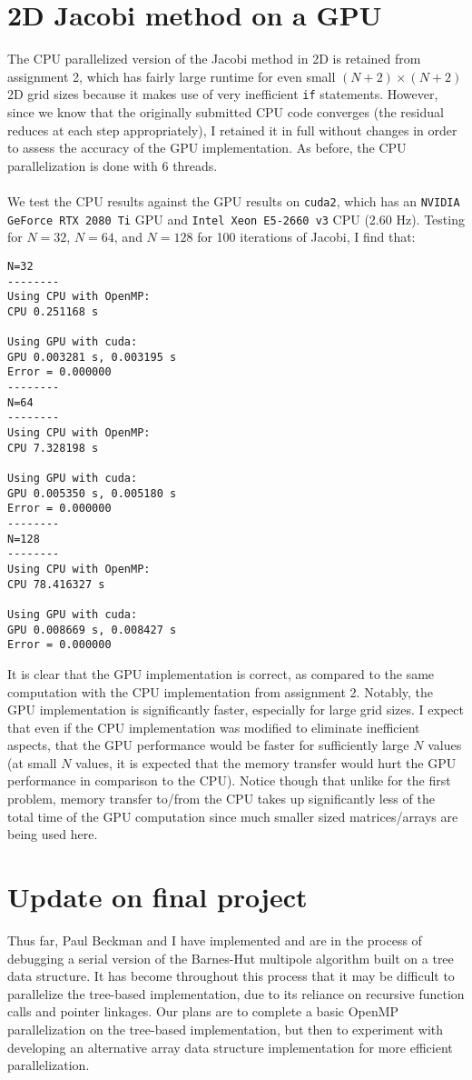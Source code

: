 \documentclass[10pt, letterpaper]{article}
\begin{document}
\section{2D Jacobi method on a GPU}
The CPU parallelized version of the Jacobi method in 2D is retained from assignment 2, which has fairly large runtime for even small $(N+2)\times(N+2)$ 2D grid sizes because it makes use of very inefficient {\tt if} statements. However, since we know that the originally submitted CPU code converges (the residual reduces at each step appropriately), I retained it in full without changes in order to assess the accuracy of the GPU implementation. As before, the CPU parallelization is done with 6 threads.\\\\
We test the CPU results against the GPU results on {\tt cuda2}, which has an {\tt NVIDIA GeForce RTX 2080 Ti} GPU and {\tt Intel Xeon E5-2660 v3} CPU (2.60 Hz). Testing for $N=32$, $N=64$, and $N=128$ for 100 iterations of Jacobi, I find that:
\begin{verbatim}
N=32
--------
Using CPU with OpenMP:
CPU 0.251168 s

Using GPU with cuda:
GPU 0.003281 s, 0.003195 s
Error = 0.000000
--------
N=64
--------
Using CPU with OpenMP:
CPU 7.328198 s

Using GPU with cuda:
GPU 0.005350 s, 0.005180 s
Error = 0.000000
--------
N=128
--------
Using CPU with OpenMP:
CPU 78.416327 s

Using GPU with cuda:
GPU 0.008669 s, 0.008427 s
Error = 0.000000
\end{verbatim}
It is clear that the GPU implementation is correct, as compared to the same computation with the CPU implementation from assignment 2. Notably, the GPU implementation is significantly faster, especially for large grid sizes. I expect that even if the CPU implementation was modified to eliminate inefficient aspects, that the GPU performance would be faster for sufficiently large $N$ values (at small $N$ values, it is expected that the memory transfer would hurt the GPU performance in comparison to the CPU). Notice though that unlike for the first problem, memory transfer to/from the CPU takes up significantly less of the total time of the GPU computation since much smaller sized matrices/arrays are being used here.


\section{Update on final project}
Thus far, Paul Beckman and I have implemented and are in the process of debugging a serial version of the Barnes-Hut multipole algorithm built on a tree data structure. It has become throughout this process that it may be difficult to parallelize the tree-based implementation, due to its reliance on recursive function calls and pointer linkages. Our plans are to complete a basic OpenMP parallelization on the tree-based implementation, but then to experiment with developing an alternative array data structure implementation for more efficient parallelization.
\end{document}
